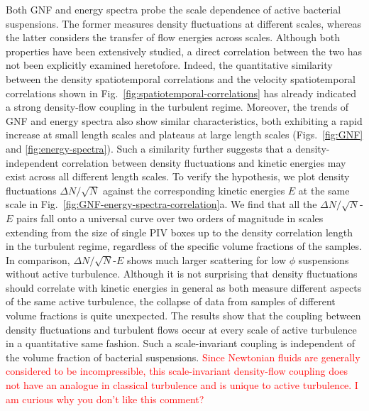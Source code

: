 \documentclass[twocolumn,aps,prx,amsmath,amssymb,longbibliography]{revtex4-2}
\begin{document}
Both GNF and energy spectra probe the scale dependence of active bacterial suspensions. The former measures density fluctuations at different scales, whereas the latter considers the transfer of flow energies across scales. Although both properties have been extensively studied, a direct correlation between the two has not been explicitly examined heretofore. Indeed, the quantitative similarity between the density spatiotemporal correlations and the velocity spatiotemporal correlations shown in Fig.~\ref{fig:spatiotemporal-correlations} has already indicated a strong density-flow coupling in the turbulent regime. Moreover, the trends of GNF and energy spectra also show similar characteristics, both exhibiting a rapid increase at small length scales and plateaus at large length scales (Figs.~\ref{fig:GNF} and \ref{fig:energy-spectra}). Such a similarity further suggests that a density-independent correlation between density fluctuations and kinetic energies may exist across all different length scales. To verify the hypothesis, we plot density fluctuations $\Delta N/\sqrt N$ against the corresponding kinetic energies $E$ at the same scale in Fig.~\ref{fig:GNF-energy-spectra-correlation}a. We find that all the $\Delta N/\sqrt N$-$E$ pairs fall onto a universal curve over two orders of magnitude in scales extending from the size of single PIV boxes up to the density correlation length in the turbulent regime, regardless of the specific volume fractions of the samples.
In comparison, $\Delta N/\sqrt N$-$E$ shows much larger scattering for low $\phi$ suspensions without active turbulence. Although it is not surprising that density fluctuations should correlate with kinetic energies in general as both measure different aspects of the same active turbulence, the collapse of data from samples of different volume fractions is quite unexpected.
The results show that the coupling between density fluctuations and turbulent flows occur at every scale of active turbulence in a quantitative same fashion. Such a scale-invariant coupling is independent of the volume fraction of bacterial suspensions.
\textcolor{red}{Since Newtonian fluids are generally considered to be incompressible, this scale-invariant density-flow coupling does not have an analogue in classical turbulence and is unique to active turbulence. I am curious why you don't like this comment?}
\end{document}
